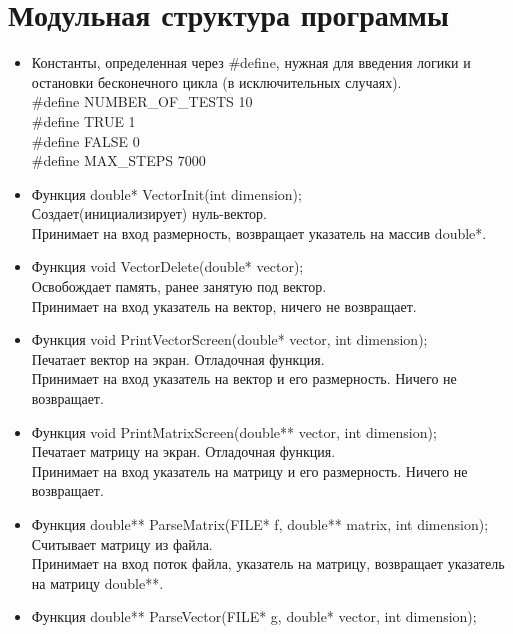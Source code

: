 \documentclass[12pt]{article}
\begin{document}
\section{Модульная структура программы}
\begin{itemize}
\item Константы, определенная через \#define, нужная для введения логики и остановки бесконечного цикла (в исключительных случаях).\\

\#define NUMBER\_OF\_TESTS 10\\
\#define TRUE 1\\
\#define FALSE 0 \\
\#define MAX\_STEPS 7000
\item Функция double* VectorInit(int dimension);\\
Создает(инициализирует) нуль-вектор.\\
Принимает на вход размерность, возвращает указатель на массив double*.\\
\item Функция void VectorDelete(double* vector);\\
Освобождает память, ранее занятую под вектор.\\
Принимает на вход указатель на вектор, ничего не возвращает.\\
\item  Функция void PrintVectorScreen(double* vector, int dimension);\\
Печатает вектор на экран. Отладочная функция.\\
Принимает на вход указатель на вектор и его размерность. Ничего не возвращает.\\
\item  Функция void PrintMatrixScreen(double** vector, int dimension);\\
Печатает матрицу на экран. Отладочная функция.\\
Принимает на вход указатель на матрицу и его размерность. Ничего не возвращает.\\
\item Функция double** ParseMatrix(FILE* f, double** matrix, int dimension);\\
Считывает матрицу из файла.\\
Принимает на вход поток файла, указатель на матрицу, возвращает указатель на матрицу double**.\\
\item Функция double** ParseVector(FILE* g, double* vector, int dimension);\\

\end{itemize}
\end{document}
